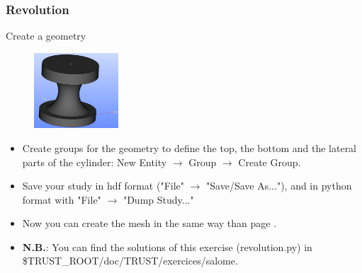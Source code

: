 \documentclass[10pt]{beamer}
\begin{document}
\begin{frame}
\frametitle{Revolution}
\begin{block}{Create a geometry}

\begin{figure}
\includegraphics[width=0.28\textwidth]{PICTURES/salome8.jpg}
\end{figure}

\begin{itemize}
\item Create groups for the geometry to define the top, the bottom and the lateral parts of the cylinder: New Entity $\rightarrow$ Group $\rightarrow$ Create Group.
\item Save your study in hdf format ("File" $\rightarrow$ "Save/Save As..."), and in python format with "File" $\rightarrow$ "Dump Study..."
\item Now you can create the mesh in the same way than page \pageref{salome_mesh}.
\item \textbf{N.B.}: You can find the solutions of this exercise (revolution.py) in \$TRUST\_ROOT/doc/TRUST/exercices/salome.
\end{itemize}

\end{block}
\end{frame}
\end{document}

